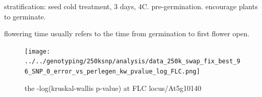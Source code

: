 \documentclass[a4paper,10pt]{article}
\begin{document}
stratification: seed cold treatment, 3 days, 4C. pre-germination. encourage plants to germinate.

flowering time usually refers to the time from germination to first flower open.

\begin{figure}
\texttt{[image: ../../genotyping/250ksnp/analysis/data\_250k\_swap\_fix\_best\_96\_SNP\_0\_error\_vs\_perlegen\_kw\_pvalue\_log\_FLC.png]}
\caption{the -log(kruskal-wallis p-value) at FLC locus/At5g10140}\label{f32}
\end{figure}

\section{}



\end{document}
